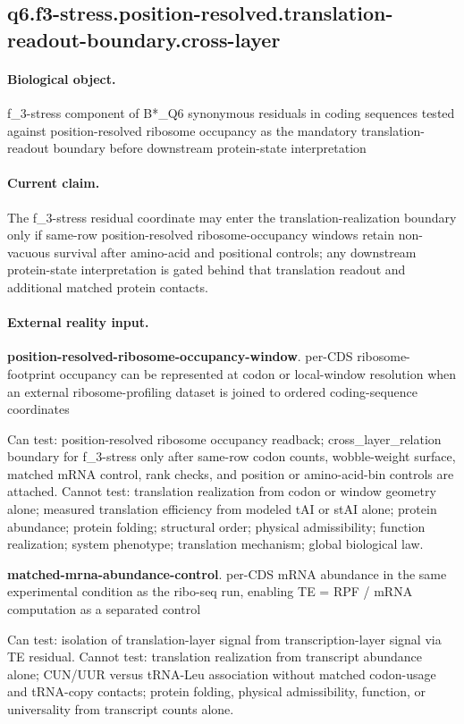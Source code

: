 \subsection{q6.f3-stress.position-resolved.translation-readout-boundary.cross-layer}

\paragraph{Biological object.} f\_3-stress component of B*\_Q6 synonymous residuals in coding sequences tested against position-resolved ribosome occupancy as the mandatory translation-readout boundary before downstream protein-state interpretation

\paragraph{Current claim.} The f\_3-stress residual coordinate may enter the translation-realization boundary only if same-row position-resolved ribosome-occupancy windows retain non-vacuous survival after amino-acid and positional controls; any downstream protein-state interpretation is gated behind that translation readout and additional matched protein contacts.

\paragraph{External reality input.}
\textbf{position-resolved-ribosome-occupancy-window}. per-CDS ribosome-footprint occupancy can be represented at codon or local-window resolution when an external ribosome-profiling dataset is joined to ordered coding-sequence coordinates

Can test: position-resolved ribosome occupancy readback; cross\_layer\_relation boundary for f\_3-stress only after same-row codon counts, wobble-weight surface, matched mRNA control, rank checks, and position or amino-acid-bin controls are attached. Cannot test: translation realization from codon or window geometry alone; measured translation efficiency from modeled tAI or stAI alone; protein abundance; protein folding; structural order; physical admissibility; function realization; system phenotype; translation mechanism; global biological law.

\textbf{matched-mrna-abundance-control}. per-CDS mRNA abundance in the same experimental condition as the ribo-seq run, enabling TE = RPF / mRNA computation as a separated control

Can test: isolation of translation-layer signal from transcription-layer signal via TE residual. Cannot test: translation realization from transcript abundance alone; CUN/UUR versus tRNA-Leu association without matched codon-usage and tRNA-copy contacts; protein folding, physical admissibility, function, or universality from transcript counts alone.


